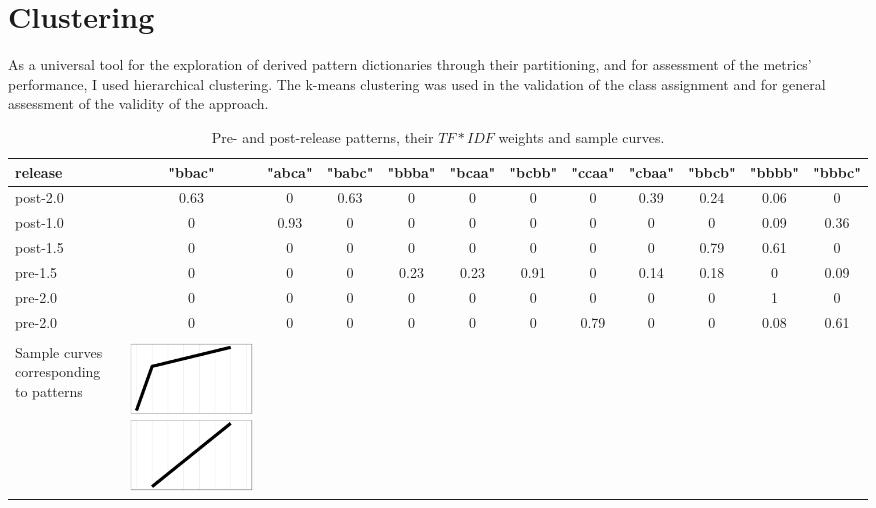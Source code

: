 \documentclass[10pt, conference, compsocconf]{IEEEtran}
\begin{document}
\section{Clustering}
As a universal tool for the exploration of derived pattern dictionaries through their partitioning, 
and for assessment of the metrics' performance, I used hierarchical clustering. The k-means
clustering was used in the validation of the class assignment and for general assessment of 
the validity of the approach.

\begin{table}
  \caption{Pre- and post-release patterns, their $TF\ast IDF$ weights and sample curves.}
  \label{tab:tokens}
  \begin{tabular}{ | b{1.5cm} | c | c | c | c | c | c | c | c | c | c | c |}
  \hline
release & "bbac" & "abca" & "babc" & "bbba" & "bcaa" & "bcbb" & "ccaa" & "cbaa" & "bbcb" & "bbbb" & "bbbc"\\ 
  \hline
 post-2.0 & 0.63 & 0 & 0.63 & 0 & 0 & 0 & 0 & 0.39 & 0.24 & 0.06 & 0\\ 
 post-1.0 & 0 & 0.93 & 0 & 0 & 0 & 0 & 0 & 0 & 0 & 0.09 & 0.36\\ 
 post-1.5 & 0 & 0 & 0 & 0 & 0 & 0 & 0 & 0 & 0.79 & 0.61 & 0\\ 
 pre-1.5 & 0 & 0 & 0 & 0.23 & 0.23 & 0.91 & 0 & 0.14 & 0.18 & 0 & 0.09\\ 
 pre-2.0 & 0 & 0 & 0 & 0 & 0 & 0 & 0 & 0 & 0 & 1 & 0\\ 
 pre-2.0 & 0 & 0 & 0 & 0 & 0 & 0 & 0.79 & 0 & 0 & 0.08 & 0.61\\
 \hline 
 &  &  &  &  &  &  & &  &  &  & \\
 Sample curves corresponding to patterns &
 \includegraphics[scale=0.08]{figures/bbac.ps} &

\end{tabular}
\end{table}
\end{document}
